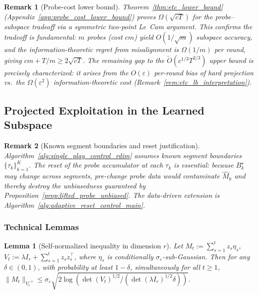 \documentclass{article}
\newtheorem{lemma}{Lemma}
\newtheorem{remark}{Remark}
\begin{document}
\begin{remark}[Probe-cost lower bound]
\label{rem:lower_bound}
Theorem~\ref{thm:etc_lower_bound} (Appendix~\ref{app:probe_cost_lower_bound}) proves $\Omega(\sqrt{cT})$ for the probe--subspace tradeoff via a symmetric two-point Le~Cam argument.
This confirms the tradeoff is fundamental: $m$ probes (cost $cm$) yield $O(1/\sqrt{m})$ subspace accuracy, and the information-theoretic regret from misalignment is $\Omega(1/m)$ per round, giving $cm + T/m \ge 2\sqrt{cT}$.
The remaining gap to the $\widetilde O(c^{1/3}T^{2/3})$ upper bound is precisely characterized: it arises from the $O(\varepsilon)$ per-round bias of hard projection vs.\ the $\Omega(\varepsilon^2)$ information-theoretic cost (Remark~\ref{rem:etc_lb_interpretation}).
\end{remark}

\subsection{Projected Exploitation in the Learned Subspace}
\label{app:projected_exploitation}

\begin{remark}[Known segment boundaries and reset justification]
\label{rem:reset_justification}
Algorithm~\ref{alg:single_play_control_rdim} assumes known segment boundaries $\{\tau_k\}_{k=1}^K$.
The reset of the probe accumulator at each $\tau_k$ is essential: because $B_k^\star$ may change across segments, pre-change probe data would contaminate $\widehat M_k$ and thereby destroy the unbiasedness guaranteed by Proposition~\ref{prop:lifted_probe_unbiased}.
The data-driven extension is Algorithm~\ref{alg:adaptive_reset_control_main}.
\end{remark}

\subsubsection{Technical Lemmas}

\begin{lemma}[Self-normalized inequality in dimension $r$]
\label{lem:self_normalized_r}
Let $M_t := \sum_{s=1}^t z_s \eta_s$, $V_t := \lambda I_r + \sum_{s=1}^t z_s z_s^\top$, where $\eta_s$ is conditionally $\sigma_\varepsilon$-sub-Gaussian. Then for any $\delta\in(0,1)$, with probability at least $1-\delta$, simultaneously for all $t\ge 1$,
$\|M_t\|_{V_t^{-1}} \le \sigma_\varepsilon \sqrt{2\log(\det(V_t)^{1/2}/(\det(\lambda I_r)^{1/2}\delta))}$.
\end{lemma}
\end{document}

